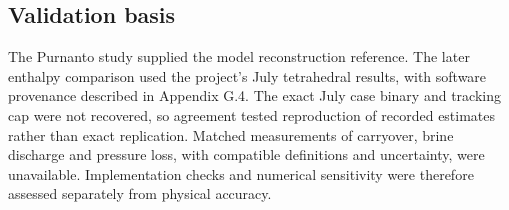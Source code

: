 \subsection{Validation basis}

The Purnanto study supplied the model reconstruction reference. The later enthalpy comparison used the project's July tetrahedral results, with software provenance described in Appendix G.4. The exact July case binary and tracking cap were not recovered, so agreement tested reproduction of recorded estimates rather than exact replication. Matched measurements of carryover, brine discharge and pressure loss, with compatible definitions and uncertainty, were unavailable. Implementation checks and numerical sensitivity were therefore assessed separately from physical accuracy.
